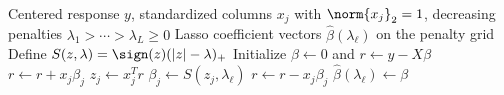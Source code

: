 \begin{breakablealgorithm}
\caption{Pathwise Coordinate Descent for the Lasso}
\label{alg:lasso-pathwise-coordinate-descent}
\begin{algorithmic}
\Require Centered response $y$, standardized columns $x_j$ with $\norm{x_j}_2=1$, decreasing penalties $\lambda_1>\cdots>\lambda_L\geq0$
\Ensure Lasso coefficient vectors $\widehat{\beta}(\lambda_\ell)$ on the penalty grid
\State Define $S(z,\lambda)=\sign(z)(|z|-\lambda)_+$
\State Initialize $\beta\gets0$ and $r\gets y-X\beta$
\Repeat
{}
\State $r\gets r+x_j\beta_j$
\State $z_j\gets x_j^Tr$
\State $\beta_j\gets S(z_j,\lambda_\ell)$
\State $r\gets r-x_j\beta_j$
\EndFor
{}
\State $\widehat{\beta}(\lambda_\ell)\gets\beta$
\EndFor
\end{algorithmic}
\end{breakablealgorithm}
